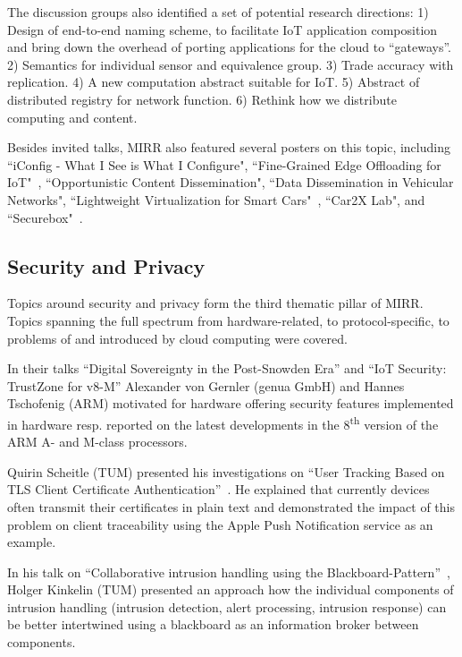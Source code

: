 The discussion groups also identified a set of potential
research directions: 1) Design of end-to-end naming scheme, to facilitate IoT
application composition and bring down the overhead of porting applications
for the cloud to ``gateways''. 2) Semantics for individual sensor and
equivalence group. 3) Trade accuracy with replication. 4) A new computation
abstract suitable for IoT. 5) Abstract of distributed registry for network
function. 6) Rethink how we distribute computing and content.

Besides invited talks, MIRR also featured several posters on this topic, including
``iConfig - What I See is What I Configure",
``Fine-Grained Edge Offloading for IoT"~\cite{cozzolino:hotconnet:2017},
``Opportunistic Content Dissemination",
``Data Dissemination in Vehicular Networks",
``Lightweight Virtualization for Smart Cars"~\cite{rmorabito:im:2017},
``Car2X Lab", and ``Securebox"~\cite{hafeez:can:2016}.


\subsection{Security and Privacy}

Topics around security and privacy form the third thematic pillar of MIRR.
Topics spanning the full spectrum from hardware-related, to protocol-specific,
to problems of and introduced by cloud computing were covered.


In their talks ``Digital Sovereignty in the Post-Snowden Era'' and ``IoT
Security: TrustZone for v8-M'' Alexander von Gernler (genua GmbH) and Hannes
Tschofenig (ARM) motivated for hardware offering security features implemented
in hardware resp. reported on the latest developments in the
8\textsuperscript{th} version of the ARM A- and M-class processors.

Quirin Scheitle (TUM) presented his investigations on ``User Tracking Based on
TLS Client Certificate Authentication''~\cite{qscheitle:tma:2017}. He explained
that currently devices often transmit their certificates in plain text and
demonstrated the impact of this problem on client traceability using the Apple
Push Notification service as an example.

In his talk on ``Collaborative intrusion handling using the
Blackboard-Pattern''~\cite{herold:iscs:2016}, Holger Kinkelin (TUM) presented an
approach how the individual components of intrusion handling (intrusion
detection, alert processing, intrusion response) can be better intertwined using
a blackboard as an information broker between components.

